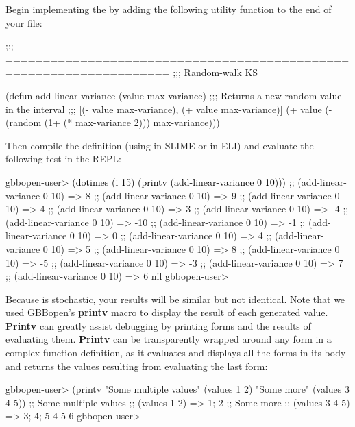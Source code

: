 \documentclass[10pt,twoside,english,pdftex]{article}
\begin{document}
Begin implementing the  by adding the following
utility function to the end of your  file:
%
\W\supp
\begin{example}
  ;;; ====================================================================
  ;;;   Random-walk KS

  (defun add-linear-variance (value max-variance)
    ;;; Returns a new random value in the interval
    ;;; [(- value max-variance), (+ value max-variance)]
    (+ value (- (random (1+ (* max-variance 2))) max-variance)))
\end{example}
%
Then compile the definition (using  in SLIME or
 in ELI) and evaluate the following test in the REPL:
%
%
%
\W\supp\notpretop
\begin{example}
\textcolor{darkergray}{%
  gbbopen-user> \textcolor{black}{(dotimes (i 15) (printv (add-linear-variance 0 10)))}
  ;;  (add-linear-variance 0 10) => 8
  ;;  (add-linear-variance 0 10) => 9
  ;;  (add-linear-variance 0 10) => 4
  ;;  (add-linear-variance 0 10) => 3
  ;;  (add-linear-variance 0 10) => -4
  ;;  (add-linear-variance 0 10) => -10
  ;;  (add-linear-variance 0 10) => -1
  ;;  (add-linear-variance 0 10) => 0
  ;;  (add-linear-variance 0 10) => 4
  ;;  (add-linear-variance 0 10) => 5
  ;;  (add-linear-variance 0 10) => 8
  ;;  (add-linear-variance 0 10) => -5
  ;;  (add-linear-variance 0 10) => -3
  ;;  (add-linear-variance 0 10) => 7
  ;;  (add-linear-variance 0 10) => 6
  nil
  gbbopen-user>}
\end{example}

Because  is stochastic, your results will be
similar but not identical.  Note that we used GBBopen's \textbf{printv}
macro to display the result of each generated value.  \textbf{Printv} can
greatly assist debugging by printing forms and the results of evaluating
them.  \textbf{Printv} can be transparently wrapped around any form in a
complex function definition, as it evaluates and displays all the forms in
its body and returns the values resulting from evaluating the last form:
%
\W\supp
\begin{example}
\textcolor{darkergray}{%
  gbbopen-user>  (printv "Some multiple values" (values 1 2) "Some more" (values 3 4 5))
  ;; Some multiple values
  ;;  (values 1 2) => 1; 2
  ;; Some more
  ;;  (values 3 4 5) => 3; 4; 5
  4
  5
  6
  gbbopen-user>}
\end{example}
\end{document}

